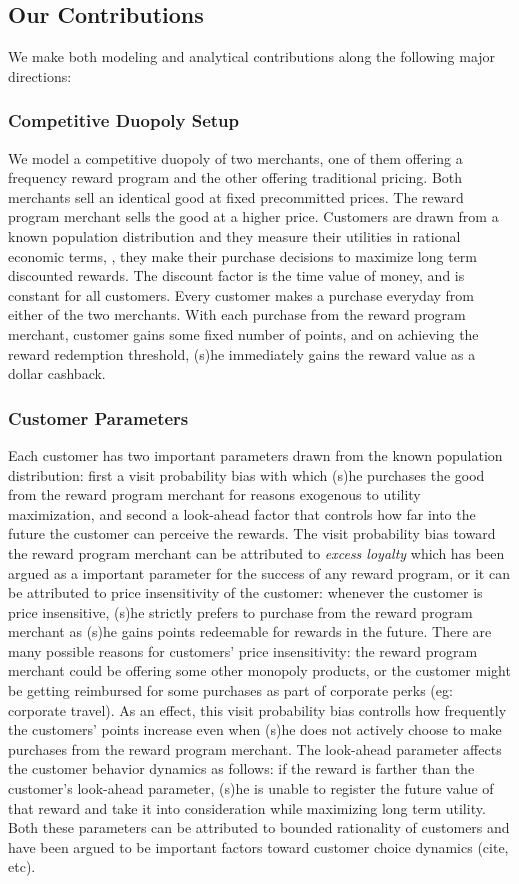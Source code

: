 \subsection{Our Contributions}
We make both modeling and analytical contributions along the following major directions:

\subsubsection{Competitive Duopoly Setup}
We model a competitive duopoly of two merchants, one of them offering a frequency reward program and the other offering traditional pricing.
Both merchants sell an identical good at fixed precommitted prices.
The reward program merchant sells the good at a higher price.
Customers are drawn from a known population distribution and they measure their utilities in rational economic terms, \ie, they make their purchase decisions to maximize long term discounted rewards.
The discount factor is the time value of money, and is constant for all customers.
Every customer makes a purchase everyday from either of the two merchants.
With each purchase from the reward program merchant, customer gains some fixed number of points, and on achieving the reward redemption threshold, (s)he immediately gains the reward value as a dollar cashback.

\subsubsection{Customer Parameters}
Each customer has two important parameters drawn from the known population distribution: first a visit probability bias with which (s)he purchases the good from the reward program merchant for reasons exogenous to utility maximization, and second a look-ahead factor that controls how far into the future the customer can perceive the rewards.
The visit probability bias toward the reward program merchant can be attributed to \emph{excess loyalty} which has been argued as a important parameter for the success of any reward program, or it can be attributed to price insensitivity of the customer: whenever the customer is price insensitive, (s)he strictly prefers to purchase from the reward program merchant as (s)he gains points redeemable for rewards in the future.
There are many possible reasons for customers' price insensitivity: the reward program merchant could be offering some other monopoly products, or the customer might be getting reimbursed for some purchases as part of corporate perks (eg: corporate travel).
As an effect, this visit probability bias controlls how frequently the customers' points increase even when (s)he does not actively choose to make purchases from the reward program merchant.
The look-ahead parameter affects the customer behavior dynamics as follows: if the reward is farther than the customer's look-ahead parameter, (s)he is unable to register the future value of that reward and take it into consideration while maximizing long term utility.
Both these parameters can be attributed to bounded rationality of customers and have been argued to be important factors toward customer choice dynamics (cite, etc).


